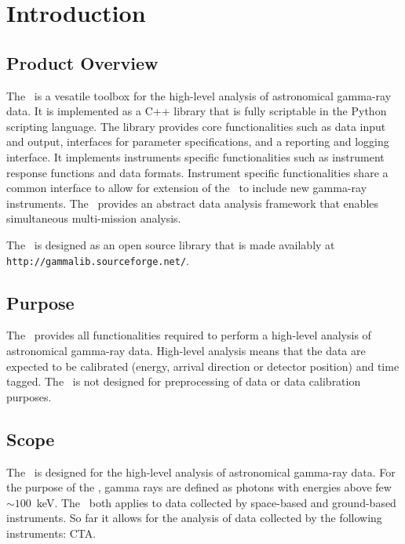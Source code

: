 \documentclass{article}[12pt,a4]
\begin{document}
\frontpage


\section{Introduction}

\subsection{Product Overview}

The \this\ is a vesatile toolbox for the high-level analysis of astronomical gamma-ray data.
It is implemented as a C++ library that is fully scriptable in the Python scripting language.
The library provides core functionalities such as 
data input and output,
interfaces for parameter specifications, and
a reporting and logging interface.
It implements instruments specific functionalities such as
instrument response functions and
data formats.
Instrument specific functionalities share a common interface to allow for extension of the \this\
to include new gamma-ray instruments.
The \this\ provides an abstract data analysis framework that enables simultaneous multi-mission
analysis.

The \this\ is designed as an open source library that is made availably at\break
{\tt http://gammalib.sourceforge.net/}.


\subsection{Purpose}

The \this\ provides all functionalities required to perform a high-level analysis of astronomical 
gamma-ray data.
High-level analysis means that the data are expected to be calibrated (energy, arrival direction or
detector position) and time tagged.
The \this\ is not designed for preprocessing of data or data calibration purposes.


\subsection{Scope}

The \this\ is designed for the high-level analysis of astronomical gamma-ray data.
For the purpose of the \this, gamma rays are defined as photons with energies above
few $\sim100$~keV.
The \this\ both applies to data collected by space-based and ground-based instruments.
So far it allows for the analysis of data collected by the following instruments:
CTA.
\end{document}
